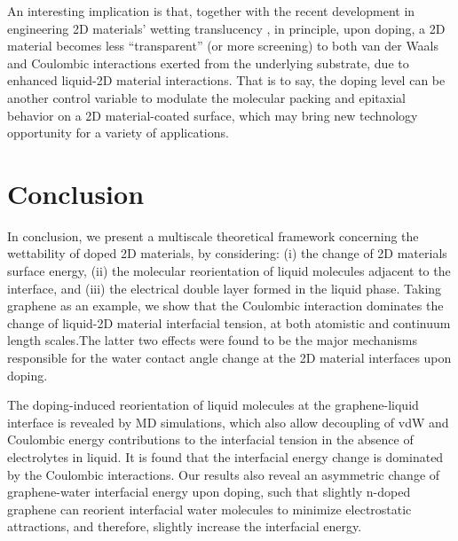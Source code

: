 \documentclass[journal=jacsat,manuscript=article,email=true,hyperref=true,keywords=true]{achemso}
\begin{document}
An interesting implication is that, together with the recent
development in engineering 2D materials’ wetting translucency
\cite{raj_wettability_2013,rafiee_wetting_2012,shih_breakdown_2012,shih_wetting_2013},
in principle, upon doping, a 2D material becomes less “transparent” (or more screening)
to both van der Waals and Coulombic interactions exerted from the underlying
substrate, due to enhanced liquid-2D material interactions. That is to say, the doping level can be
another control variable to modulate the molecular packing and
epitaxial behavior on a 2D material-coated surface, which may bring
new technology opportunity for a variety of applications.


\section{Conclusion}
\label{sec:org258c77f}

In conclusion, we present a multiscale theoretical framework
concerning the wettability of doped 2D materials, by considering: (i)
the change of 2D materials surface energy, (ii) the molecular
reorientation of liquid molecules adjacent to the interface, and (iii)
the electrical double layer formed in the liquid phase. Taking
graphene as an example, we show that the Coulombic interaction
dominates the change of liquid-2D material interfacial tension, at
both atomistic and continuum length scales.The latter two effects were
found to be the major mechanisms responsible for the water contact angle
change at the 2D material interfaces upon doping.

The doping-induced reorientation of liquid molecules at the
graphene-liquid interface is revealed by MD simulations, which also
allow decoupling of vdW and Coulombic energy contributions to the
interfacial tension in the absence of electrolytes in liquid. It is
found that the interfacial energy change is dominated by the Coulombic
interactions. Our results also reveal an asymmetric change of
graphene-water interfacial energy upon doping, such that slightly
n-doped graphene can reorient interfacial water molecules to minimize
electrostatic attractions, and therefore, slightly increase the
interfacial energy.
\end{document}
